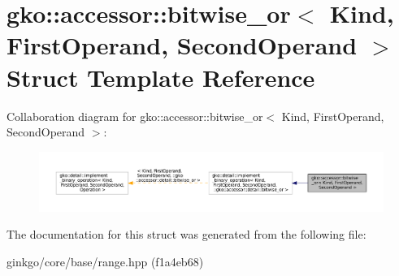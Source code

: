 \hypertarget{structgko_1_1accessor_1_1bitwise__or}{}\section{gko\+:\+:accessor\+:\+:bitwise\+\_\+or$<$ Kind, First\+Operand, Second\+Operand $>$ Struct Template Reference}
\label{structgko_1_1accessor_1_1bitwise__or}


Collaboration diagram for gko\+:\+:accessor\+:\+:bitwise\+\_\+or$<$ Kind, First\+Operand, Second\+Operand $>$\+:
\nopagebreak
\begin{figure}[H]
\begin{center}
\leavevmode
\includegraphics[width=350pt]{structgko_1_1accessor_1_1bitwise__or__coll__graph}
\end{center}
\end{figure}


The documentation for this struct was generated from the following file\+:\begin{DoxyCompactItemize}
\item 
ginkgo/core/base/range.\+hpp (f1a4eb68)\end{DoxyCompactItemize}
